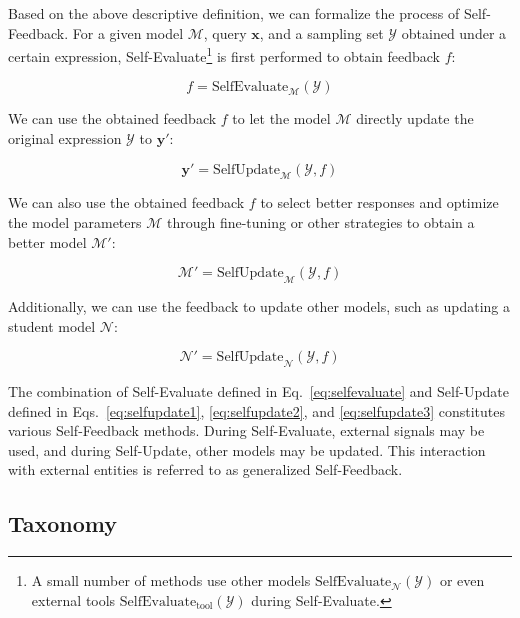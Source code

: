 \documentclass[lettersize,journal]{IEEEtran}
\begin{document}
Based on the above descriptive definition, we can formalize the process of Self-Feedback. For a given model $\mathcal{M}$, query $\boldsymbol{x}$, and a sampling set $\mathcal{Y}$ obtained under a certain expression, Self-Evaluate\footnote{A small number of methods use other models $\text{SelfEvaluate}_\mathcal{N}(\mathcal{Y})$ or even external tools $\text{SelfEvaluate}_\text{tool}(\mathcal{Y})$ during Self-Evaluate.} is first performed to obtain feedback $f$:

\begin{equation}
    f = \text{SelfEvaluate}_\mathcal{M}(\mathcal{Y})
    \label{eq:selfevaluate}
\end{equation}

We can use the obtained feedback $f$ to let the model $\mathcal{M}$ directly update the original expression $\mathcal{Y}$ to $\boldsymbol{y}'$:

\begin{equation}
    \boldsymbol{y}'=\text{SelfUpdate}_\mathcal{M}(\mathcal{Y}, f)
    \label{eq:selfupdate1}
\end{equation}

We can also use the obtained feedback $f$ to select better responses and optimize the model parameters $\mathcal{M}$ through fine-tuning or other strategies to obtain a better model $\mathcal{M}'$:

\begin{equation}
    \mathcal{M}'=\text{SelfUpdate}_\mathcal{M}(\mathcal{Y}, f)
    \label{eq:selfupdate2}
\end{equation}

Additionally, we can use the feedback to update other models, such as updating a student model $\mathcal{N}$:

\begin{equation}
    \mathcal{N}'=\text{SelfUpdate}_\mathcal{N}(\mathcal{Y}, f)
    \label{eq:selfupdate3}
\end{equation}

The combination of Self-Evaluate defined in Eq.~\ref{eq:selfevaluate} and Self-Update defined in Eqs.~\ref{eq:selfupdate1}, \ref{eq:selfupdate2}, and \ref{eq:selfupdate3} constitutes various Self-Feedback methods. During Self-Evaluate, external signals may be used, and during Self-Update, other models may be updated. This interaction with external entities is referred to as generalized Self-Feedback.


\subsection{Taxonomy}
\end{document}
